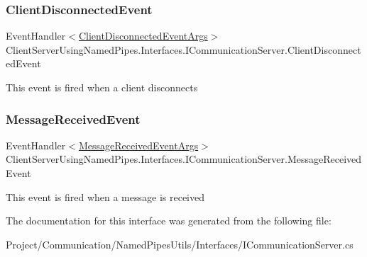 \subsubsection{\texorpdfstring{Client\+Disconnected\+Event}{ClientDisconnectedEvent}}
{\footnotesize\ttfamily Event\+Handler$<$\hyperlink{class_client_server_using_named_pipes_1_1_interfaces_1_1_client_disconnected_event_args}{Client\+Disconnected\+Event\+Args}$>$ Client\+Server\+Using\+Named\+Pipes.\+Interfaces.\+I\+Communication\+Server.\+Client\+Disconnected\+Event}



This event is fired when a client disconnects 

\mbox{\label{interface_client_server_using_named_pipes_1_1_interfaces_1_1_i_communication_server_a8acf3ca7ac738a4d693beb7efc7fd226}} 
\subsubsection{\texorpdfstring{Message\+Received\+Event}{MessageReceivedEvent}}
{\footnotesize\ttfamily Event\+Handler$<$\hyperlink{class_client_server_using_named_pipes_1_1_interfaces_1_1_message_received_event_args}{Message\+Received\+Event\+Args}$>$ Client\+Server\+Using\+Named\+Pipes.\+Interfaces.\+I\+Communication\+Server.\+Message\+Received\+Event}



This event is fired when a message is received 



The documentation for this interface was generated from the following file\+:\begin{DoxyCompactItemize}
\item 
Project/\+Communication/\+Named\+Pipes\+Utils/\+Interfaces/I\+Communication\+Server.\+cs\end{DoxyCompactItemize}
